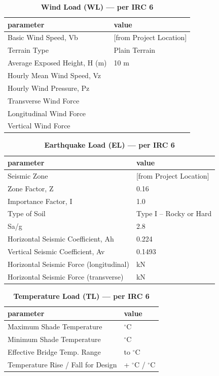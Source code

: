 \documentclass[12pt,a4paper]{report}
\numberwithin{table}{chapter}
\numberwithin{figure}{chapter}
\begin{document}
\vspace{1em}
\begin{longtable}{|L{5.5cm}|p{10.0cm}|}
\caption{\textbf{Wind Load (WL) --- per IRC 6}}
\hline
\textbf{parameter} & \textbf{value} \\
\hline
\textnormal{Basic Wind Speed, Vb} &  [from Project Location] \\[6pt]
\hline
\textnormal{Terrain Type} & Plain Terrain \\[6pt]
\hline
\textnormal{Average Exposed Height, H (m)} & 10 m \\[6pt]
\hline
\textnormal{Hourly Mean Wind Speed, Vz} &  \\[6pt]
\hline
\textnormal{Hourly Wind Pressure, Pz} &  \\[6pt]
\hline
\textnormal{Transverse Wind Force} &  \\[6pt]
\hline
\textnormal{Longitudinal Wind Force} &  \\[6pt]
\hline
\textnormal{Vertical Wind Force} &  \\[6pt]
\hline
\end{longtable}

\vspace{1em}
\begin{longtable}{|L{5.5cm}|p{10.0cm}|}
\caption{\textbf{Earthquake Load (EL) --- per IRC 6}}
\hline
\textbf{parameter} & \textbf{value} \\
\hline
\textnormal{Seismic Zone} &  [from Project Location] \\[6pt]
\hline
\textnormal{Zone Factor, Z} & 0.16 \\[6pt]
\hline
\textnormal{Importance Factor, I} & 1.0 \\[6pt]
\hline
\textnormal{Type of Soil} & Type I – Rocky or Hard \\[6pt]
\hline
\textnormal{Sa/g} & 2.8 \\[6pt]
\hline
\textnormal{Horizontal Seismic Coefficient, Ah} & 0.224 \\[6pt]
\hline
\textnormal{Vertical Seismic Coefficient, Av} & 0.1493 \\[6pt]
\hline
\textnormal{Horizontal Seismic Force (longitudinal)} &  kN \\[6pt]
\hline
\textnormal{Horizontal Seismic Force (transverse)} &  kN \\[6pt]
\hline
\end{longtable}

\vspace{1em}
\begin{longtable}{|L{5.5cm}|p{10.0cm}|}
\caption{\textbf{Temperature Load (TL) --- per IRC 6}}
\hline
\textbf{parameter} & \textbf{value} \\
\hline
\textnormal{Maximum Shade Temperature} &  $^\circ$C \\[6pt]
\hline
\textnormal{Minimum Shade Temperature} &  $^\circ$C \\[6pt]
\hline
\textnormal{Effective Bridge Temp. Range} &  to  $^\circ$C \\[6pt]
\hline
\textnormal{Temperature Rise / Fall for Design} & + $^\circ$C / \textminus{} $^\circ$C \\[6pt]
\hline
\end{longtable}
\end{document}
